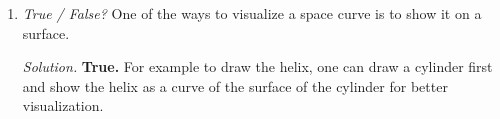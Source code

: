 \documentclass{article}
\newcommand{\rr}{\mathbf{r}}
\begin{document}
\begin{enumerate}
{\em Solution.} {\bf True.} Suppose there is such a curve that is not smooth. Then its derivative $\rr'(t)$ must not be defined at some point or is the zero vector. One of its projections onto $xy$-plane, $yz$-plane or $xz$-plane must then have undefined derivative or zero derivative at the same $t$-value, meaning that this projection will not be smooth.

\item {\em True / False?} One of the ways to visualize a space curve is to show it on a surface.

{\em Solution.} {\bf True.} For example to draw the helix, one can draw a cylinder first and show the helix as a curve of the surface of the cylinder for better visualization.
\end{enumerate}
\end{document}
